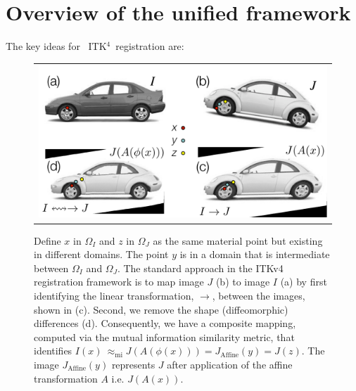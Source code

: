 \documentclass{llncs}
\newcommand{\tk}{~ITK$^{\text{4}}$~}
\begin{document}
\section{Overview of the unified framework}
The key ideas for \tk registration are:
\begin{figure}[t]
\begin{center}
\begin{tabular}{c}
\includegraphics[width=4.5in]{figs/RegistrationNomenclature.pdf}
\end{tabular}
\caption{\baselineskip 12pt \small Define $x$ in $\Omega_I$ and $z$ in
  $\Omega_J$ as the same material point but existing in different
  domains.  The point $y$ is in a domain that is intermediate between
  $\Omega_I$ and $\Omega_J$.  The standard approach in the ITKv4
  registration framework is to map image $J$ (b) to image $I$ (a) by first
  identifying the linear transformation, $\rightarrow$, between the images, shown in (c).  Second, we remove the shape (diffeomorphic)
  differences (d).  Consequently, we have a composite mapping, computed via the
  mutual information similarity metric, that identifies
  $I(x) ~\approx_\text{mi}  J(A(\phi(x))) =  J_\text{Affine}(y) = J(z)
  $. The image $J_\text{Affine}(y)$
  represents $J$ after application of the affine transformation $A$
  i.e. $J(A(x))$.}
\label{fig:composite}
\end{center}
\end{figure}
\end{document}
